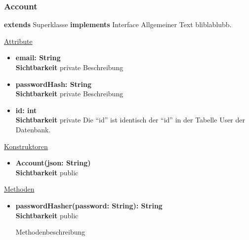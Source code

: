 \subsubsection{Account} \label{service:klasse:Account}
\textbf{extends} Superklasse \newline
\textbf{implements} Interface \newline
Allgemeiner Text bliblablubb. \newline

\underline{Attribute}
\begin{itemize}
\itemsep0pt
\item \textbf{email: String} \hfill\\ 
\textbf{Sichtbarkeit} private 
Beschreibung

\item \textbf{passwordHash: String} \hfill\\ 
\textbf{Sichtbarkeit} private 
Beschreibung

\item \textbf{id: int} \hfill\\ 
\textbf{Sichtbarkeit} private  
Die ``id'' ist identisch der ``id'' in der Tabelle User der Datenbank.
\end{itemize}

\underline{Konstruktoren}
\begin{itemize}
\itemsep0pt
\item \textbf{Account(json: String)} \hfill\\
\textbf{Sichtbarkeit} public
\end{itemize}

\underline{Methoden}
\begin{itemize}
\itemsep0pt
\item \textbf{passwordHasher(password: String): String}\hfill\\
\textbf{Sichtbarkeit} public

Methodenbeschreibung

\end{itemize}